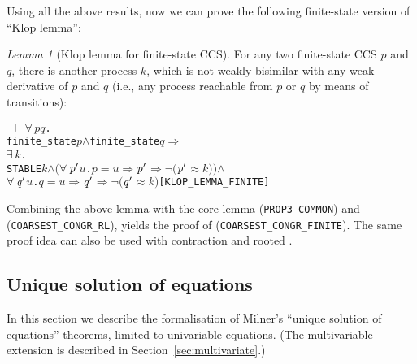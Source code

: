 \documentclass[GCNS]{yincog}
\renewcommand{\HOLConst}[1]{\texttt{#1}}
\renewcommand{\HOLBoundVar}[1]{\ensuremath{\mathit{#1}}}
\renewcommand{\HOLSymConst}[1]{#1}
\renewcommand{\HOLTokenConj}{\ensuremath{\wedge}}
\renewcommand{\HOLTokenNeg}{\ensuremath{\neg}}
\renewcommand{\HOLTokenExists}{\ensuremath{\exists \,}}
\renewcommand{\HOLTokenForall}{\ensuremath{\forall \,}}
\renewcommand{\HOLTokenTurnstile}{\ensuremath{\:\:\vdash}}
\theoremstyle{remark}
\theoremstyle{theorem}
\newtheorem{lemma}[definition]{Lemma}
\theoremstyle{remark}
\newcommand{\HOLTokenWeakEQ}{$\approx$}
\newcommand{\HOLTokenWeakTransBegin}{$=$}
\newcommand{\HOLTokenWeakTransEnd}{$\Rightarrow$\xspace}
\renewcommand{\HOLTokenImp}{\ensuremath{\Longrightarrow}}
\newcommand{\univariate}{univariable\xspace}
\newcommand{\multivariate}{multivariable\xspace}
\begin{document}
Using all the above results, now we can prove the following finite-state
version of ``Klop lemma'':
%
\begin{lemma}[Klop lemma for finite-state CCS]
 \label{lem:klop-lemma-finite}
For any two finite-state CCS $p$ and $q$, there is another process
$k$, which is not weakly bisimilar with any weak derivative of $p$ and
$q$ (i.e., any process reachable from $p$ or $q$ by means of transitions):
%
\begin{alltt}
\HOLTokenTurnstile{} \HOLSymConst{\HOLTokenForall{}}\HOLBoundVar{p} \HOLBoundVar{q}.
       \HOLConst{finite\_state} \HOLBoundVar{p} \HOLSymConst{\HOLTokenConj{}} \HOLConst{finite\_state} \HOLBoundVar{q} \HOLSymConst{\HOLTokenImp{}}
       \HOLSymConst{\HOLTokenExists{}}\HOLBoundVar{k}.
           \HOLConst{STABLE} \HOLBoundVar{k} \HOLSymConst{\HOLTokenConj{}} \ensuremath{(}\HOLSymConst{\HOLTokenForall{}}\ensuremath{\HOLBoundVar{p}\sp{\prime}} \HOLBoundVar{u}. \HOLBoundVar{p} \HOLTokenWeakTransBegin\HOLBoundVar{u}\HOLTokenWeakTransEnd \ensuremath{\HOLBoundVar{p}\sp{\prime}} \HOLSymConst{\HOLTokenImp{}} \HOLSymConst{\HOLTokenNeg{}}\ensuremath{(}\ensuremath{\HOLBoundVar{p}\sp{\prime}} \HOLSymConst{\HOLTokenWeakEQ} \HOLBoundVar{k}\ensuremath{)}\ensuremath{)} \HOLSymConst{\HOLTokenConj{}}
           \HOLSymConst{\HOLTokenForall{}}\ensuremath{\HOLBoundVar{q}\sp{\prime}} \HOLBoundVar{u}. \HOLBoundVar{q} \HOLTokenWeakTransBegin\HOLBoundVar{u}\HOLTokenWeakTransEnd \ensuremath{\HOLBoundVar{q}\sp{\prime}} \HOLSymConst{\HOLTokenImp{}} \HOLSymConst{\HOLTokenNeg{}}\ensuremath{(}\ensuremath{\HOLBoundVar{q}\sp{\prime}} \HOLSymConst{\HOLTokenWeakEQ} \HOLBoundVar{k}\ensuremath{)}\hfill{[KLOP\_LEMMA\_FINITE]}
\end{alltt}
%
\end{lemma}
%
Combining the above lemma with the core lemma (\texttt{PROP3\_COMMON}) and
 (\texttt{COARSEST\_CONGR\_RL}), yields the proof
of  (\texttt{COARSEST\_CONGR\_FINITE}).
The same proof idea can also be used with contraction and rooted .

\subsection{Unique solution of equations}
 \label{ss:part2}

In this section we describe the formalisation of Milner's ``unique solution
of equations'' theorems, limited to \univariate equations. (The
\multivariate extension is described in Section~\ref{sec:multivariate}.)
\end{document}
